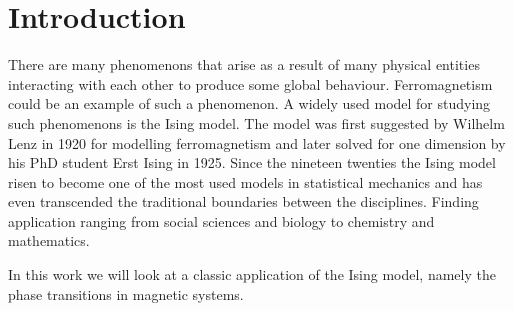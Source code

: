 \section{Introduction}
There are many phenomenons that arise as a result of many physical entities
interacting with each other to produce some global behaviour.
Ferromagnetism could be an example of such a phenomenon. A widely used model for
studying such phenomenons is the Ising model.
The model was first suggested by Wilhelm Lenz in 1920 for modelling ferromagnetism and later solved
for one dimension by his PhD student Erst Ising in 1925. Since the nineteen
twenties the Ising model risen to become one of the most used models in
statistical mechanics and has even
transcended the traditional boundaries between the disciplines. Finding     
application ranging from social sciences and biology to chemistry and
mathematics.     

In this work we will look at a classic application of the Ising model, namely
the phase transitions in magnetic systems. 


